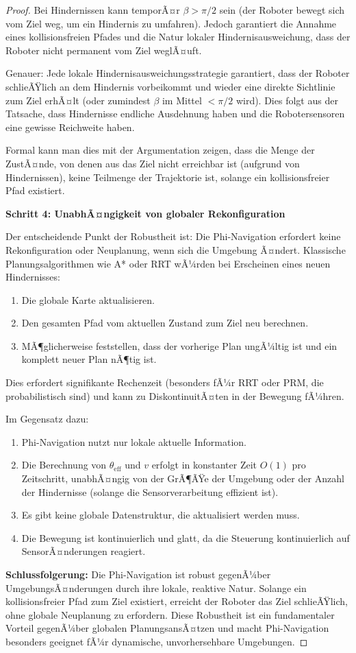 ﻿\documentclass[a4paper,12pt]{article}
\theoremstyle{definition}
\begin{document}
\begin{proof}
Bei Hindernissen kann temporÃ¤r $\beta > \pi/2$ sein (der Roboter bewegt sich vom Ziel weg, um ein Hindernis zu umfahren). Jedoch garantiert die Annahme eines kollisionsfreien Pfades und die Natur lokaler Hindernisausweichung, dass der Roboter nicht permanent vom Ziel weglÃ¤uft.

Genauer: Jede lokale Hindernisausweichungsstrategie garantiert, dass der Roboter schlieÃŸlich an dem Hindernis vorbeikommt und wieder eine direkte Sichtlinie zum Ziel erhÃ¤lt (oder zumindest $\beta$ im Mittel $< \pi/2$ wird). Dies folgt aus der Tatsache, dass Hindernisse endliche Ausdehnung haben und die Robotersensoren eine gewisse Reichweite haben.

Formal kann man dies mit der Argumentation zeigen, dass die Menge der ZustÃ¤nde, von denen aus das Ziel nicht erreichbar ist (aufgrund von Hindernissen), keine Teilmenge der Trajektorie ist, solange ein kollisionsfreier Pfad existiert.

\textbf{Schritt 4: UnabhÃ¤ngigkeit von globaler Rekonfiguration}

Der entscheidende Punkt der Robustheit ist: Die Phi-Navigation erfordert keine Rekonfiguration oder Neuplanung, wenn sich die Umgebung Ã¤ndert. Klassische Planungsalgorithmen wie A* oder RRT wÃ¼rden bei Erscheinen eines neuen Hindernisses:
\begin{enumerate}
\item Die globale Karte aktualisieren.
\item Den gesamten Pfad vom aktuellen Zustand zum Ziel neu berechnen.
\item MÃ¶glicherweise feststellen, dass der vorherige Plan ungÃ¼ltig ist und ein komplett neuer Plan nÃ¶tig ist.
\end{enumerate}

Dies erfordert signifikante Rechenzeit (besonders fÃ¼r RRT oder PRM, die probabilistisch sind) und kann zu DiskontinuitÃ¤ten in der Bewegung fÃ¼hren.

Im Gegensatz dazu:
\begin{enumerate}
\item Phi-Navigation nutzt nur lokale aktuelle Information.
\item Die Berechnung von $\theta_{\text{eff}}$ und $v$ erfolgt in konstanter Zeit $O(1)$ pro Zeitschritt, unabhÃ¤ngig von der GrÃ¶ÃŸe der Umgebung oder der Anzahl der Hindernisse (solange die Sensorverarbeitung effizient ist).
\item Es gibt keine globale Datenstruktur, die aktualisiert werden muss.
\item Die Bewegung ist kontinuierlich und glatt, da die Steuerung kontinuierlich auf SensorÃ¤nderungen reagiert.
\end{enumerate}

\textbf{Schlussfolgerung:} Die Phi-Navigation ist robust gegenÃ¼ber UmgebungsÃ¤nderungen durch ihre lokale, reaktive Natur. Solange ein kollisionsfreier Pfad zum Ziel existiert, erreicht der Roboter das Ziel schlieÃŸlich, ohne globale Neuplanung zu erfordern. Diese Robustheit ist ein fundamentaler Vorteil gegenÃ¼ber globalen PlanungsansÃ¤tzen und macht Phi-Navigation besonders geeignet fÃ¼r dynamische, unvorhersehbare Umgebungen.
\end{proof}
\end{document}
